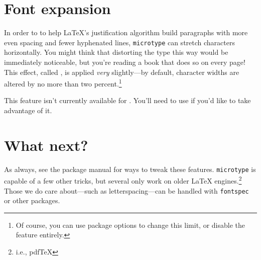 \section{Font expansion}

In order to to help \LaTeX's justification algorithm build paragraphs with
more even spacing and fewer hyphenated lines,
\texttt{microtype} can stretch characters horizontally.
You might think that distorting the type this way would be immediately
noticeable,
but you're reading a book that does so on every page!
This effect, called ,
is applied \emph{very} slightly---by default,
character widths are altered by no more than two percent.\punckern\footnote{%
Of course, you can use package options to change this limit,
or disable the feature entirely.}

This feature isn't currently available for \XeLaTeX{}.
You'll need to use \LuaLaTeX{} if you'd like to take advantage of it.

\section{What next?}

As always, see the package manual for ways to tweak these features.
\texttt{microtype} is capable of a few other tricks,
but several only work on older \LaTeX{} engines.\punckern\footnote{i.e., pdf\TeX}
Those we do care about---such as letterspacing---can be handled with
\texttt{fontspec} or other packages.
